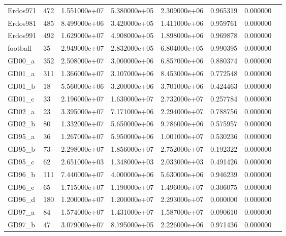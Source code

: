 \begin{tabular}{llrrrrrr}
Erdos971                &  472 &  1.551000e+07 &  5.380000e+05 &  2.309000e+06 &  0.965319 &  0.000000 \\
Erdos981                &  485 &  8.499000e+06 &  3.420000e+05 &  1.411000e+06 &  0.959761 &  0.000000 \\
Erdos991                &  492 &  1.629000e+07 &  4.908000e+05 &  1.898000e+06 &  0.969878 &  0.000000 \\
football                &   35 &  2.949000e+07 &  2.832000e+05 &  6.804000e+05 &  0.990395 &  0.000000 \\
GD00\_a                  &  352 &  2.508000e+07 &  3.000000e+06 &  6.857000e+06 &  0.880374 &  0.000000 \\
GD01\_a                  &  311 &  1.366000e+07 &  3.107000e+06 &  8.453000e+06 &  0.772548 &  0.000000 \\
GD01\_b                  &   18 &  5.560000e+06 &  3.200000e+06 &  3.701000e+06 &  0.424463 &  0.000000 \\
GD01\_c                  &   33 &  2.196000e+07 &  1.630000e+07 &  2.732000e+07 &  0.257784 &  0.000000 \\
GD02\_a                  &   23 &  3.395000e+07 &  7.171000e+06 &  2.294000e+07 &  0.788756 &  0.000000 \\
GD02\_b                  &   80 &  1.332000e+07 &  5.650000e+06 &  9.786000e+06 &  0.575957 &  0.000000 \\
GD95\_a                  &   36 &  1.267000e+07 &  5.950000e+06 &  1.001000e+07 &  0.530236 &  0.000000 \\
GD95\_b                  &   73 &  2.298000e+07 &  1.856000e+07 &  2.752000e+07 &  0.192322 &  0.000000 \\
GD95\_c                  &   62 &  2.651000e+03 &  1.348000e+03 &  2.033000e+03 &  0.491426 &  0.000000 \\
GD96\_b                  &  111 &  7.440000e+07 &  4.000000e+06 &  5.630000e+06 &  0.946239 &  0.000000 \\
GD96\_c                  &   65 &  1.715000e+07 &  1.190000e+07 &  1.496000e+07 &  0.306075 &  0.000000 \\
GD96\_d                  &  180 &  1.200000e+07 &  1.200000e+07 &  2.293000e+07 &  0.000000 &  0.000000 \\
GD97\_a                  &   84 &  1.574000e+07 &  1.431000e+07 &  1.587000e+07 &  0.090610 &  0.000000 \\
GD97\_b                  &   47 &  3.079000e+07 &  8.795000e+05 &  2.226000e+06 &  0.971436 &  0.000000 \\

\end{tabular}
